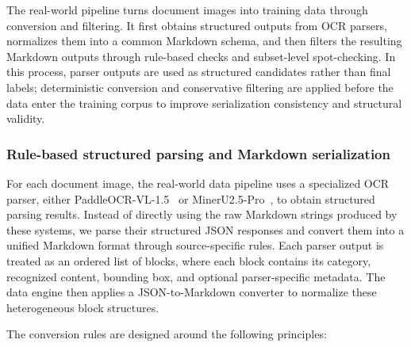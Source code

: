 The real-world pipeline turns document images into training data through conversion and filtering. It first obtains structured outputs from OCR parsers, normalizes them into a common Markdown schema, and then filters the resulting Markdown outputs through rule-based checks and subset-level spot-checking. In this process, parser outputs are used as structured candidates rather than final labels; deterministic conversion and conservative filtering are applied before the data enter the training corpus to improve serialization consistency and structural validity.

\subsubsection{Rule-based structured parsing and Markdown serialization}

For each document image, the real-world data pipeline uses a specialized OCR parser, either PaddleOCR-VL-1.5~\cite{paddleocrvl15} or MinerU2.5-Pro~\cite{mineru25pro}, to obtain structured parsing results. Instead of directly using the raw Markdown strings produced by these systems, we parse their structured JSON responses and convert them into a unified Markdown format through source-specific rules. Each parser output is treated as an ordered list of blocks, where each block contains its category, recognized content, bounding box, and optional parser-specific metadata. The data engine then applies a JSON-to-Markdown converter to normalize these heterogeneous block structures.

The conversion rules are designed around the following principles:

